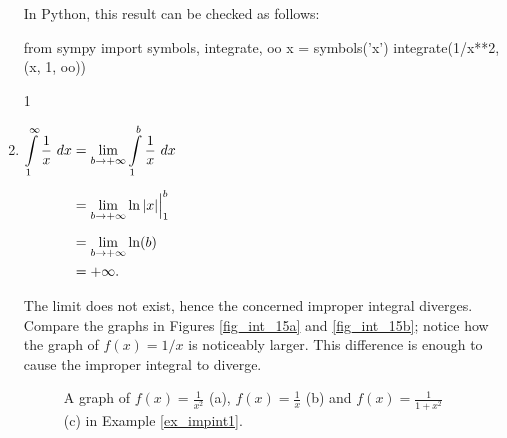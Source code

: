 \begin{example}
\begin{enumerate}
\ifpython
In Python, this result can be checked as follows: 
\begin{pyin}
from sympy import symbols, integrate, oo
x = symbols('x')
integrate(1/x**2, (x, 1, oo))
\end{pyin}
\begin{pyout}
1
\end{pyout}
\fi
 
\item		\hfill$\begin{aligned}[t]%
			\ds \int\limits_1^\infty \frac1x\ dx & = \lim_{b\to+\infty}\ds \int\limits_1^b\frac1x\ dx \\[0.2cm]
						&= \lim_{b\to+\infty} \ln |x|\Big|_1^b \\[0.2cm]
						&= \lim_{b\to+\infty} \ln (b)\\
						&= +\infty.
	\end{aligned}$\hfill\null
	
The limit does not exist, hence the concerned improper integral  diverges. Compare the graphs in Figures \ref{fig_int_15a} and \ref{fig_int_15b}; notice how the graph of $f(x) = 1/x$ is noticeably larger. This difference is enough to cause the improper integral to diverge.

\begin{figure}[H]
\centering
\qquad
{}
\qquad
{}
\caption{A graph of  $f(x) = \frac{1}{x^2}$ (a),  $f(x) = \frac{1}{x}$ (b) and $f(x) = \frac{1}{1+x^2}$ (c) in Example \ref{ex_impint1}.}
\end{figure} 


\end{enumerate}
\end{example}
